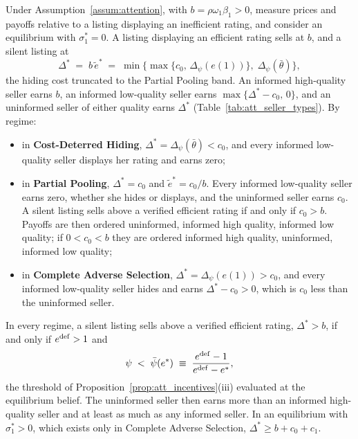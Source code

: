 \label{prop:att_seller_types}
Under Assumption~\ref{assum:attention}, with $b=\rho\omega_1\beta_1>0$, measure prices and payoffs relative to a listing displaying an inefficient rating, and consider an equilibrium with $\sigma_1^*=0$. A listing displaying an efficient rating sells at $b$, and a silent listing at
\begin{equation}
    \Delta^*\;=\;b\,\tilde e^*\;=\;\min\Big\{\max\big\{c_0,\,\Delta_\psi(e(1))\big\},\;\Delta_\psi(\bar\theta)\Big\},
    \label{eq:att_premium_trunc}
\end{equation}
the hiding cost truncated to the Partial Pooling band. An informed high-quality seller earns $b$, an informed low-quality seller earns $\max\{\Delta^*-c_0,\,0\}$, and an uninformed seller of either quality earns $\Delta^*$ (Table~\ref{tab:att_seller_types}). By regime:
\begin{itemize}
    \item in \textbf{Cost-Deterred Hiding}, $\Delta^*=\Delta_\psi(\bar\theta)<c_0$, and every informed low-quality seller displays her rating and earns zero;
    \item in \textbf{Partial Pooling}, $\Delta^*=c_0$ and $\tilde e^*=c_0/b$. Every informed low-quality seller earns zero, whether she hides or displays, and the uninformed seller earns $c_0$. A silent listing sells above a verified efficient rating if and only if $c_0>b$. Payoffs are then ordered uninformed, informed high quality, informed low quality; if $0<c_0<b$ they are ordered informed high quality, uninformed, informed low quality;
    \item in \textbf{Complete Adverse Selection}, $\Delta^*=\Delta_\psi(e(1))>c_0$, and every informed low-quality seller hides and earns $\Delta^*-c_0>0$, which is $c_0$ less than the uninformed seller.
\end{itemize}
In every regime, a silent listing sells above a verified efficient rating, $\Delta^*>b$, if and only if $e^{\rm def}>1$ and
\begin{equation}
    \psi\;<\;\bar\psi(e^*)\;\equiv\;\frac{e^{\rm def}-1}{e^{\rm def}-e^*},
    \label{eq:att_psibar}
\end{equation}
the threshold of Proposition~\ref{prop:att_incentives}(iii) evaluated at the equilibrium belief. The uninformed seller then earns more than an informed high-quality seller and at least as much as any informed seller. In an equilibrium with $\sigma_1^*>0$, which exists only in Complete Adverse Selection, $\Delta^*\ge b+c_0+c_1$.
